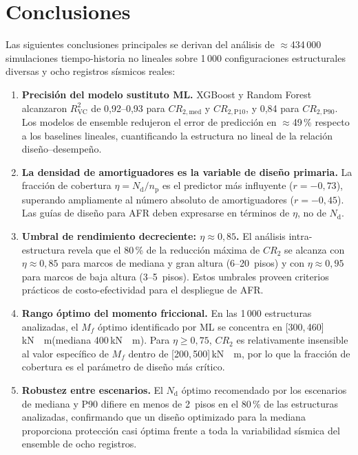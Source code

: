 \documentclass[preprint,12pt,authoryear]{elsarticle}
\newcommand{\CR}[1]{CR_{2,\text{#1}}}
\newcommand{\Rsq}{R^{2}_{\mathrm{VC}}}
\newcommand{\nd}{N_{\mathrm{d}}}
\newcommand{\np}{n_{\mathrm{p}}}              %
\newcommand{\etad}{\eta}
\newcommand{\Mf}{M_{\!f}}
\newcommand{\KM}{\,\si{kN{\cdot}m}}
\begin{document}
\section{Conclusiones}
\label{sec:conclusions}

Las siguientes conclusiones principales se derivan del análisis de
$\approx$434\,000 simulaciones tiempo-historia no lineales sobre 1\,000
configuraciones estructurales diversas y ocho registros sísmicos reales:

\begin{enumerate}

\item \textbf{Precisión del modelo sustituto ML.}
XGBoost y Random Forest alcanzaron $\Rsq$ de 0{,}92--0{,}93 para $\CR{med}$ y
$\CR{P10}$, y 0{,}84 para $\CR{P90}$. Los modelos de ensemble redujeron el error
de predicción en $\approx$49\,\% respecto a los baselines lineales, cuantificando
la estructura no lineal de la relación diseño--desempeño.

\item \textbf{La densidad de amortiguadores es la variable de diseño primaria.}
La fracción de cobertura $\etad = \nd/\np$ es el predictor más influyente
($r = -0{,}73$), superando ampliamente al número absoluto de amortiguadores
($r = -0{,}45$). Las guías de diseño para AFR deben expresarse en términos de
$\etad$, no de $\nd$.

\item \textbf{Umbral de rendimiento decreciente: $\etad \approx 0{,}85$.}
El análisis intra-estructura revela que el 80\,\% de la reducción máxima de
$CR_2$ se alcanza con $\etad \approx 0{,}85$ para marcos de mediana y gran
altura (6--20~pisos) y con $\etad \approx 0{,}95$ para marcos de baja altura
(3--5~pisos). Estos umbrales proveen criterios prácticos de costo-efectividad
para el despliegue de AFR.

\item \textbf{Rango óptimo del momento friccional.}
En las 1\,000 estructuras analizadas, el $\Mf$ óptimo identificado por ML se
concentra en [300,\,460]\KM (mediana 400\KM). Para $\etad \geq 0{,}75$,
$CR_2$ es relativamente insensible al valor específico de $\Mf$ dentro de
[200,\,500]\KM, por lo que la fracción de cobertura es el parámetro de diseño
más crítico.

\item \textbf{Robustez entre escenarios.}
El $\nd$ óptimo recomendado por los escenarios de mediana y P90 difiere en menos
de 2~pisos en el 80\,\% de las estructuras analizadas, confirmando que un diseño
optimizado para la mediana proporciona protección casi óptima frente a toda la
variabilidad sísmica del ensemble de ocho registros.


\end{enumerate}
\end{document}
